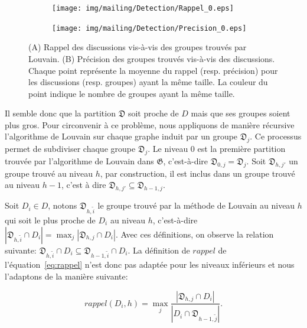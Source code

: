 \begin{figure}
\centering

\hfill
	\begin{subfigure}{0.45\textwidth}
		\texttt{[image: img/mailing/Detection/Rappel\_0.eps]}
		\caption{}		
	\end{subfigure}\hfill
	\begin{subfigure}{0.45\textwidth}
		\texttt{[image: img/mailing/Detection/Precision\_0.eps]}
		\caption{}		
	\end{subfigure}\hfill

\caption{(A) Rappel des discussions vis-à-vis des groupes trouvés par Louvain.
 (B) Précision des groupes trouvés vis-à-vis des discussions.
Chaque point représente la moyenne du rappel (resp. précision) pour les discussions (resp. groupes) ayant la même taille.
La couleur du point indique le nombre de groupes ayant la même taille.}
\label{fig:rec_inclusion_niveau0}
\end{figure}


Il semble donc que la partition $\mathfrak{D}$ soit proche de $D$ mais que ses groupes soient plus gros.
Pour circonvenir à ce problème, nous appliquons de manière récursive l'algorithme de Louvain sur chaque graphe induit par un groupe $\mathfrak{D}_j$.
Ce processus permet de subdiviser chaque groupe $\mathfrak{D}_j$.
Le niveau $0$ est la première partition trouvée par l'algorithme de Louvain dans $\mathfrak{G}$, c'est-à-dire $\mathfrak{D}_{0,j}=\mathfrak{D}_j$.
Soit $\mathfrak{D}_{h,j'}$ un groupe trouvé au niveau $h$, par construction, il est inclus dans un groupe trouvé au niveau $h-1$, c'est à dire $\mathfrak{D}_{h,j'} \subseteq \mathfrak{D}_{h-1,j}$.


Soit $D_i \in D$, notons $\mathfrak{D}_{h,\tilde{i}}$ le groupe trouvé par la méthode de Louvain au niveau $h$ qui soit le plus proche de $D_i$ au niveau $h$, c'est-à-dire $|\mathfrak{D}_{h,\tilde{i}}\cap D_i|= \max_{j} |\mathfrak{D}_{h,j} \cap D_i|$.
Avec ces définitions, on observe la relation suivante: $\mathfrak{D}_{h,\tilde{i}}\cap D_i \subseteq \mathfrak{D}_{h-1,\tilde{i}}\cap D_i$.
La définition de $rappel$ de l'équation~\ref{eq:rappel} n'est donc pas adaptée pour les niveaux inférieurs et nous l'adaptons de la manière suivante:

\begin{equation}
rappel(D_i,h)= \max_{j} \frac{|\mathfrak{D}_{h,j} \cap D_i|}{|D_i \cap \mathfrak{D}_{h-1,\tilde{j}}|}.
\end{equation}

